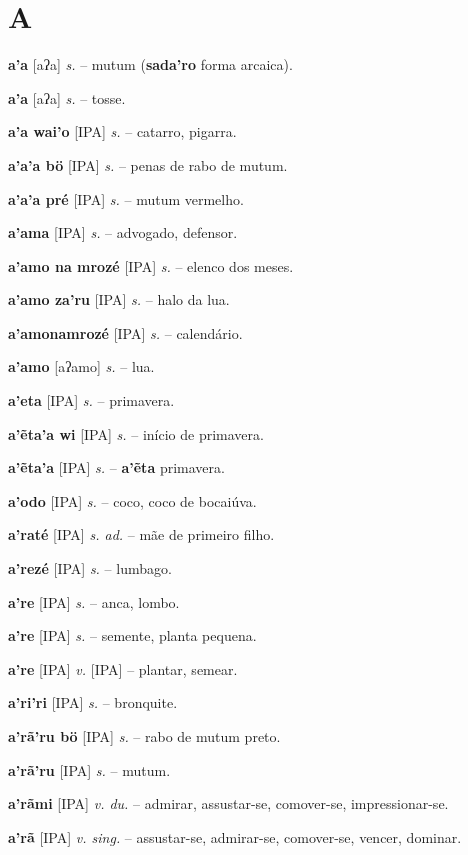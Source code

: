 \section*{A}

\textbf{a'a} [aʔa] \textit{s.} -- mutum (\textbf{sada'ro} forma arcaica).

\textbf{a'a} [aʔa] \textit{s.} -- tosse.

\textbf{a'a wai'o} [IPA] \textit{s.} -- catarro, pigarra.

\textbf{a'a'a bö} [IPA] \textit{s.} -- penas de rabo de mutum.

\textbf{a'a'a pré} [IPA] \textit{s.} -- mutum vermelho.

\textbf{a'ama} [IPA] \textit{s.} -- advogado, defensor.

\textbf{a'amo na mrozé} [IPA] \textit{s.} -- elenco dos meses.

\textbf{a'amo za'ru} [IPA] \textit{s.} -- halo da lua.

\textbf{a'amonamrozé} [IPA] \textit{s.} -- calendário.

\textbf{a'amo} [aʔamo] \textit{s.} -- lua.

\textbf{a'eta} [IPA] \textit{s.} -- primavera.

\textbf{a'ẽta'a wi} [IPA] \textit{s.} -- início de primavera.

\textbf{a'ẽta'a} [IPA] \textit{s.} -- \textbf{a'ẽta} primavera.

\textbf{a'odo} [IPA] \textit{s.} -- coco, coco de bocaiúva.

\textbf{a'raté} [IPA] \textit{s. ad.} -- mãe de primeiro filho.

\textbf{a'rezé} [IPA] \textit{s.} -- lumbago.

\textbf{a're} [IPA] \textit{s.} -- anca, lombo.

\textbf{a're} [IPA] \textit{s.} -- semente, planta pequena.

\textbf{a're} [IPA] \textit{v.} [IPA] -- plantar, semear.

\textbf{a'ri'ri} [IPA] \textit{s.} -- bronquite.

\textbf{a'rã'ru bö} [IPA] \textit{s.} -- rabo de mutum preto.

\textbf{a'rã'ru} [IPA] \textit{s.} -- mutum.

\textbf{a'rãmi} [IPA] \textit{v. du.} -- admirar, assustar-se, comover-se, impressionar-se.

\textbf{a'rã} [IPA] \textit{v. sing.} -- assustar-se, admirar-se, comover-se, vencer, dominar.

